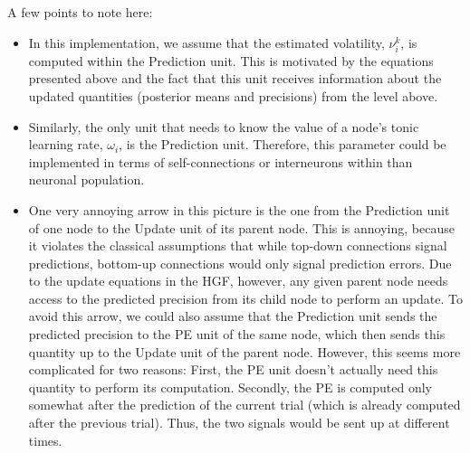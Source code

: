 A few points to note here:
\begin{itemize}
\item In this implementation, we assume that the estimated volatility, $\nu_i^{k}$, is computed within the \textsf{Prediction} unit. This is motivated by the equations presented above and the fact that this unit receives information about the updated quantities (posterior means and precisions) from the level above.
\item Similarly, the only unit that needs to know the value of a node's tonic learning rate, $\omega_i$, is the \textsf{Prediction} unit. Therefore, this parameter could be implemented in terms of self-connections or interneurons within than neuronal population.
\item One very annoying arrow in this picture is the one from the \textsf{Prediction} unit of one node to the \textsf{Update} unit of its parent node. This is annoying, because it violates the classical assumptions that while top-down connections signal predictions, bottom-up connections would only signal prediction errors. Due to the update equations in the HGF, however, any given parent node needs access to the predicted precision from its child node to perform an update. To avoid this arrow, we could also assume that the \textsf{Prediction} unit sends the predicted precision to the \textsf{PE} unit of the same node, which then sends this quantity up to the \textsf{Update} unit of the parent node. However, this seems more complicated for two reasons: First, the \textsf{PE} unit doesn't actually need this quantity to perform its computation. Secondly, the PE is computed only somewhat after the prediction of the current trial (which is already computed after the previous trial). Thus, the two signals would be sent up at different times.
\end{itemize}
